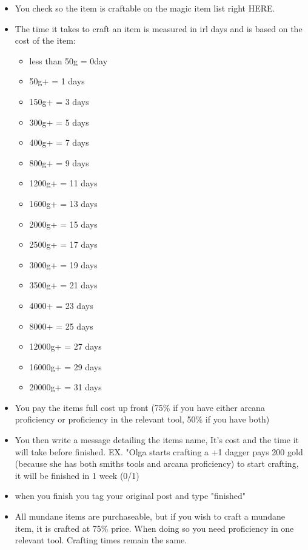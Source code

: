 \documentclass{article}
\begin{document}
    \begin{itemize}
        \item You check so the item is craftable on the magic item list right HERE.
        \item The time it takes to craft an item is measured in irl days and is based on the cost of the item: 
        \begin{itemize}
            \item   less than 50g = 0day
            \item   50g+ = 1 days
            \item   150g+ = 3 days
            \item   300g+ = 5 days
            \item   400g+ = 7 days
            \item   800g+ = 9 days
            \item   1200g+ = 11 days
            \item   1600g+ = 13 days
            \item   2000g+ = 15 days
            \item   2500g+ = 17 days
            \item   3000g+ = 19 days
            \item   3500g+ = 21 days
            \item   4000+ = 23 days
            \item   8000+ = 25 days
            \item   12000g+ = 27 days
            \item   16000g+ = 29 days
            \item   20000g+ = 31 days
        \end{itemize}
        \item You pay the items full cost up front (75\% if you have either arcana proficiency or proficiency in the relevant tool, 50\% if you have both)
        \item You then write a message detailing the items name, It's cost and the time it will take before finished. EX. "Olga starts crafting a +1 dagger pays 200 gold (because she has both smiths tools and arcana proficiency) to start crafting, it will be finished in 1 week (0/1)
        \item when you finish you tag your original post and type "finished"
        \item All mundane items are purchaseable, but if you wish to craft a mundane item, it is crafted at 75\% price. When doing so you need proficiency in one relevant tool. Crafting times remain the same.
    \end{itemize}
\end{document}
